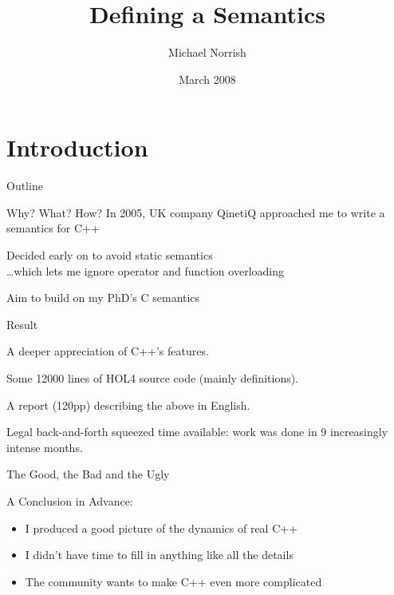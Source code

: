 \documentclass[compress,dvips,color=usenames,xcolor=dvipsnames]{beamer}
\title{Defining a \cpp{} Semantics}
\author{Michael Norrish}
\institute[NICTA]{Canberra Research Lab., NICTA}
\date{March 2008}
\newcommand{\cpp}{\mbox{C\hspace{-.1em}+\hspace{-.05em}+}}
\begin{document}
\frame{\titlepage}
\section{Introduction}
\begin{frame}{Outline}\tableofcontents\end{frame}

\begin{frame}{Why? What? How?}
In 2005, UK company QinetiQ approached me to write a semantics
  for \cpp{}

\bigskip
Decided early on to avoid static semantics\\[1mm]
  \quad\quad\dots {\footnotesize which lets me ignore operator and function overloading}

\bigskip
Aim to build on my PhD's C semantics
\end{frame}

\begin{frame}{Result}

A deeper appreciation of \cpp's features.

\bigskip
Some 12\hspace{.1em}000 lines of HOL4 source code (mainly definitions).

\bigskip
A report (120pp) describing the above in English.

\bigskip
Legal back-and-forth squeezed time available: work was done in 9
increasingly intense months.

\end{frame}

\begin{frame}{The Good, the Bad and the Ugly}

A Conclusion in Advance:
\begin{itemize}
\item I produced a good picture of the dynamics of real \cpp
\item I didn't have time to fill in anything like all the details
\item The community wants to make \cpp{} even more complicated
\end{itemize}

\end{frame}
\end{document}
